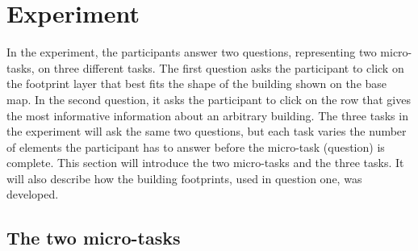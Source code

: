 \section{Experiment}\label{sec:experiment}
In the experiment, the participants answer two questions, representing two micro-tasks, on three different tasks. The first question asks the participant to click on the footprint layer that best fits the shape of the building shown on the base map. In the second question, it asks the participant to click on the row that gives the most informative information about an arbitrary building. The three tasks in the experiment will ask the same two questions, but each task varies the number of elements the participant has to answer before the micro-task (question) is complete. This section will introduce the two micro-tasks and the three tasks. It will also describe how the building footprints, used in question one, was developed. 

\subsection{The two micro-tasks}\label{sec:experimentquestions}

